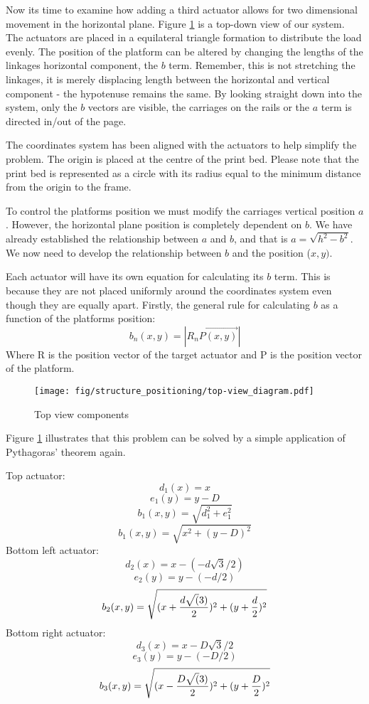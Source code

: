 \documentclass[a4paper, 11pt, twoside]{Thesis}  %
\begin{document}
Now its time to examine how adding a third actuator allows for two dimensional movement in the horizontal plane. Figure \ref{fig:top-view_diagram.svg} is a top-down view of our system. The actuators are placed in a equilateral triangle formation to distribute the load evenly. The position of the platform can be altered by changing the lengths of the linkages horizontal component, the $b$ term. Remember, this is not stretching the linkages, it is merely displacing length between the horizontal and vertical component - the hypotenuse remains the same. By looking straight down into the system, only the $b$ vectors are visible, the carriages on the rails or the $a$ term is  directed in/out of the page.

The coordinates system has been aligned with the actuators to help simplify the problem. The origin is placed at the centre of the print bed. Please note that the print bed is represented as a circle with its radius equal to the minimum distance from the origin to the frame. 

To control the platforms position we must modify the carriages vertical position $a$. However, the horizontal plane position is completely dependent on $b$. We have already established the relationship between $a$ and $b$, and that is $a = \sqrt{ h^2 - b^2}$. We now need to develop the relationship between $b$ and the position ($x,y)$.

Each actuator will have its own equation for calculating its $b$ term. This is because they are not placed uniformly around the coordinates system even though they are equally apart. Firstly, the general rule for calculating $b$ as a function of the platforms position:
$$b_n(x,y) = |\overrightarrow{R_n P(x,y)}|$$ Where R is the position vector of the target actuator and P is the position vector of the platform.

\begin{figure}[H]
\centering%
\texttt{[image: fig/structure\_positioning/top-view\_diagram.pdf]}
\caption{Top view components}
\label{fig:top-view_diagram.svg}
\end{figure}
Figure \ref{fig:top-view_diagram.svg} illustrates that this problem can be solved by a simple application of Pythagoras' theorem again.

Top actuator:
$$d_1(x) =  x$$
$$e_1(y) =  y - D$$
$$b_1(x,y) = \sqrt{d_1^2 + e_1^2}$$
$$b_1(x,y) = \sqrt{ x^2 + (y - D )^2}$$
Bottom left actuator:
$$d_2(x) = x - (-d\sqrt{3}/2)$$
$$e_2(y) = y - (-d/2)$$
$$b_2(x,y) = \sqrt{ ( x + {d\sqrt(3)\over 2})^2 + ( y + {d\over 2})^2   } $$
Bottom right actuator:
$$d_3(x) = x - D\sqrt{3}/2$$
$$e_3(y) = y - (-D/2)$$
$$b_3(x,y) = \sqrt{ ( x - {D\sqrt(3)\over 2})^2 + ( y + {D\over 2})^2   } $$
\end{document}
